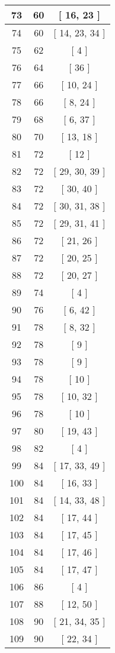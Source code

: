 \begin{center}
\begin{longtable}[H]{|| c c c ||}
73 & 60 & [ 16, 23 ] \\ 
\hline
74 & 60 & [ 14, 23, 34 ] \\ 
\hline
75 & 62 & [ 4 ] \\ 
\hline
76 & 64 & [ 36 ] \\ 
\hline
77 & 66 & [ 10, 24 ] \\ 
\hline
78 & 66 & [ 8, 24 ] \\ 
\hline
79 & 68 & [ 6, 37 ] \\ 
\hline
80 & 70 & [ 13, 18 ] \\ 
\hline
81 & 72 & [ 12 ] \\ 
\hline
82 & 72 & [ 29, 30, 39 ] \\ 
\hline
83 & 72 & [ 30, 40 ] \\ 
\hline
84 & 72 & [ 30, 31, 38 ] \\ 
\hline
85 & 72 & [ 29, 31, 41 ] \\ 
\hline
86 & 72 & [ 21, 26 ] \\ 
\hline
87 & 72 & [ 20, 25 ] \\ 
\hline
88 & 72 & [ 20, 27 ] \\ 
\hline
89 & 74 & [ 4 ] \\ 
\hline
90 & 76 & [ 6, 42 ] \\ 
\hline
91 & 78 & [ 8, 32 ] \\ 
\hline
92 & 78 & [ 9 ] \\ 
\hline
93 & 78 & [ 9 ] \\ 
\hline
94 & 78 & [ 10 ] \\ 
\hline
95 & 78 & [ 10, 32 ] \\ 
\hline
96 & 78 & [ 10 ] \\ 
\hline
97 & 80 & [ 19, 43 ] \\ 
\hline
98 & 82 & [ 4 ] \\ 
\hline
99 & 84 & [ 17, 33, 49 ] \\ 
\hline
100 & 84 & [ 16, 33 ] \\ 
\hline
101 & 84 & [ 14, 33, 48 ] \\ 
\hline
102 & 84 & [ 17, 44 ] \\ 
\hline
103 & 84 & [ 17, 45 ] \\ 
\hline
104 & 84 & [ 17, 46 ] \\ 
\hline
105 & 84 & [ 17, 47 ] \\ 
\hline
106 & 86 & [ 4 ] \\ 
\hline
107 & 88 & [ 12, 50 ] \\ 
\hline
108 & 90 & [ 21, 34, 35 ] \\ 
\hline
109 & 90 & [ 22, 34 ] \\ 

\end{longtable}
\end{center}
